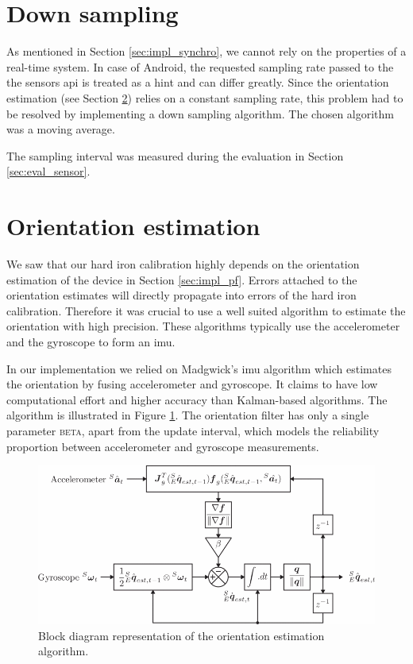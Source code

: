 \section{Down sampling}
\label{sec:impl_downsample}

As mentioned in Section \ref{sec:impl_synchro}, we cannot rely on the properties of a real-time system. In case of Android, the requested sampling rate passed to the the sensors \gls{api} is treated as a hint and can differ greatly. Since the orientation estimation (see Section \ref{sec:ori_est}) relies on a constant sampling rate, this problem had to be resolved by implementing a down sampling algorithm. The chosen algorithm was a moving average.

The sampling interval was measured during the evaluation in Section \ref{sec:eval_sensor}.

\section{Orientation estimation}
\label{sec:ori_est}

We saw that our hard iron calibration highly depends on the orientation estimation of the device in Section \ref{sec:impl_pf}. Errors attached to the orientation estimates will directly propagate into errors of the hard iron calibration. Therefore it was crucial to use a well suited algorithm to estimate the orientation with high precision. These algorithms typically use the accelerometer and the gyroscope to form an \gls{imu}.

In our implementation we relied on Madgwick's \gls{imu} algorithm\cite{madgwick} which estimates the orientation by fusing accelerometer and gyroscope. It claims to have low computational effort and higher accuracy than Kalman-based algorithms. The algorithm is illustrated in Figure \ref{fig:madgwick_imu}. The orientation filter has only a single parameter \textsc{beta}, apart from the update interval, which models the reliability proportion between accelerometer and gyroscope measurements.

\begin{figure}[hbt!]
    \centering
    \includegraphics[width=1.0\textwidth]{figures/madgwick_imu.png}
    \caption{Block diagram representation of the orientation estimation algorithm.\cite{madgwick}}
    \label{fig:madgwick_imu}
\end{figure}

